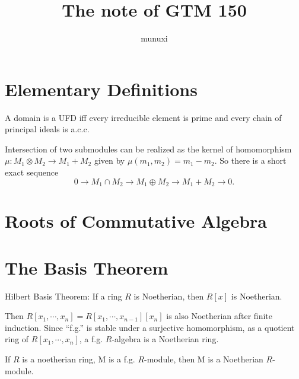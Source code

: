 \documentclass[11pt]{extarticle}
\title{The note of GTM 150}
\author{munuxi}
\begin{document}
\maketitle
\tableofcontents

\section*{Elementary Definitions}

\pro A domain is a UFD iff every irreducible element is prime and every chain of principal ideals is a.c.c.

\para Intersection of two submodules can be realized as the kernel of homomorphism $\mu:M_1\otimes M_2\to M_1+M_2$ given by $\mu(m_1,m_2)=m_1-m_2$. So there is a short exact sequence
\[
	0\to M_1\cap M_2 \to M_1\oplus M_2 \to M_1+M_2 \to 0.
\]

\section{Roots of Commutative Algebra}

\section{The Basis Theorem}

\theo Hilbert Basis Theorem: If a ring $R$ is Noetherian, then $R[x]$ is Noetherian.

Then $R[x_1,\cdots,x_n]=R[x_1,\cdots,x_{n-1}][x_n]$ is also Noetherian after finite induction. Since ``f.g.'' is stable under a surjective homomorphism, as a quotient ring of $R[x_1,\cdots,x_n]$, a f.g. $R$-algebra is a Noetherian ring.

\pro If $R$ is a noetherian ring, M is a f.g. $R$-module, then M is a Noetherian $R$-module.

\end{document}
